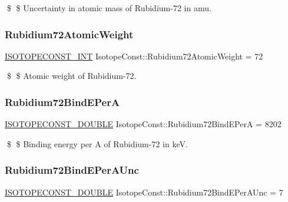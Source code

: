 \$ \$ Uncertainty in atomic mass of Rubidium-\/72 in amu. \mbox{\label{group___isotope_const-_rubidium-_rb72_ga0d11b369e7459e930cddd263f63181e5}} 
\subsubsection{\texorpdfstring{Rubidium72\+Atomic\+Weight}{Rubidium72AtomicWeight}}
{\footnotesize\ttfamily \mbox{\hyperlink{group___isotope_const-_macros_ga5f18360b3e99483a35c32d789e62621c}{I\+S\+O\+T\+O\+P\+E\+C\+O\+N\+S\+T\+\_\+\+I\+NT}} Isotope\+Const\+::\+Rubidium72\+Atomic\+Weight = 72}

\$ \$ Atomic weight of Rubidium-\/72. \mbox{\label{group___isotope_const-_rubidium-_rb72_gaa314b74c4088dca4372439289a3e6f37}} 
\subsubsection{\texorpdfstring{Rubidium72\+Bind\+E\+PerA}{Rubidium72BindEPerA}}
{\footnotesize\ttfamily \mbox{\hyperlink{group___isotope_const-_macros_ga8f45a7272ce02c0b4c65c44636ed719a}{I\+S\+O\+T\+O\+P\+E\+C\+O\+N\+S\+T\+\_\+\+D\+O\+U\+B\+LE}} Isotope\+Const\+::\+Rubidium72\+Bind\+E\+PerA = 8202}

\$ \$ Binding energy per A of Rubidium-\/72 in keV. \mbox{\label{group___isotope_const-_rubidium-_rb72_gae9213fb31fd63198e2a74011acbca8db}} 
\subsubsection{\texorpdfstring{Rubidium72\+Bind\+E\+Per\+A\+Unc}{Rubidium72BindEPerAUnc}}
{\footnotesize\ttfamily \mbox{\hyperlink{group___isotope_const-_macros_ga8f45a7272ce02c0b4c65c44636ed719a}{I\+S\+O\+T\+O\+P\+E\+C\+O\+N\+S\+T\+\_\+\+D\+O\+U\+B\+LE}} Isotope\+Const\+::\+Rubidium72\+Bind\+E\+Per\+A\+Unc = 7}

